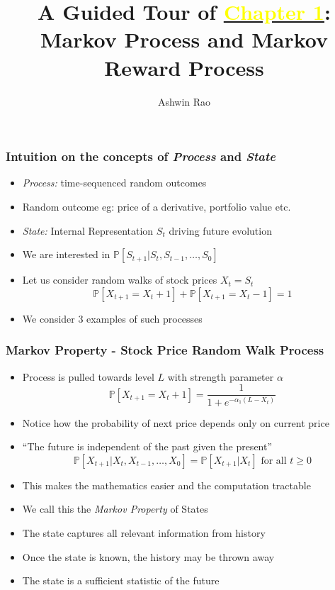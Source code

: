 \documentclass[handout]{beamer}
\title[Markov Process Chapter]{A Guided Tour of \href{http://stanford.edu/~ashlearn/RLForFinanceBook/book.pdf}{\underline{\textcolor{yellow}{Chapter 1}}}: \\  Markov Process and Markov Reward Process} %
\author{Ashwin Rao} %
\institute[Stanford] %
{ICME, Stanford University
}
\date %
\begin{document}
\lstset{language=Python}  
\begin{frame}
\titlepage %
\end{frame}


\begin{frame}
\frametitle{Intuition on the concepts of {\em Process} and {\em State}}
\pause
\begin{itemize}[<+->]
\item {\em Process:} time-sequenced random outcomes
\item Random outcome eg: price of a derivative, portfolio value etc.
\item {\em State:} Internal Representation $S_t$ driving future evolution
\item We are interested in $\mathbb{P}[S_{t+1}|S_t, S_{t-1}, \ldots, S_0]$
\item Let us consider random walks of stock prices $X_t = S_t$
$$\mathbb{P}[X_{t+1} = X_t + 1] + \mathbb{P}[X_{t+1} = X_t - 1] = 1$$
\item We consider 3 examples of such processes
\end{itemize}
\end{frame}

\begin{frame}
\frametitle{Markov Property - Stock Price Random Walk Process}
\pause
\begin{itemize}[<+->]
\item Process is pulled towards level $L$ with strength parameter $\alpha$
$$\mathbb{P}[X_{t+1} = X_t + 1] = \frac 1 {1 + e^{-\alpha_1(L - X_t)}}$$
\item Notice how the probability of next price depends only on current price
\item ``The future is independent of the past given the present''
$$\mathbb{P}[X_{t+1}|X_t, X_{t-1}, \ldots, X_0] = \mathbb{P}[X_{t+1}|X_t]\text{ for all } t \geq 0$$
\item This makes the mathematics easier and the computation tractable
\item We call this the {\em Markov Property} of States
\item The state captures all relevant information from history
\item Once the state is known, the history may be thrown away
\item The state is a sufficient statistic of the future
\end{itemize}
\end{frame}
\end{document}
